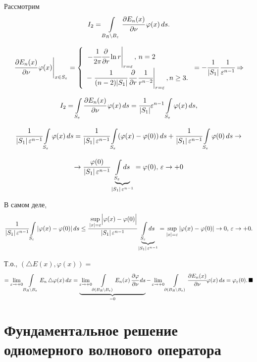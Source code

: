 \documentclass[12pt,a4paper,draft]{article}
\DeclareRobustCommand*{\т}{~--- }
\DeclareRobustCommand*{\ч}{~-- }
\begin{document}
Рассмотрим $$I_2=\int\limits_{B_R\setminus
B_{\varepsilon}}\cfrac{\partial E_n(x)}{\partial
\nu}\,\varphi(x)\,ds.$$

$$\left.\cfrac{\partial E_n(x)}{\partial
\nu}\,\varphi(x)\right|_{x\in S_{\varepsilon}}=
\left\{%
\begin{array}{ll}
    \left.-\cfrac1{2\pi} \cfrac {\partial}{\partial r}\ln r\right|_{r=\varepsilon},\,n=2  \\

    -\left.\cfrac1{(n-2)|S_1|}\,\cfrac {\partial}{\partial r}\,\cfrac1{r^{n-2}}\right|_{r=\varepsilon},
     n\ge3. \\
\end{array}%
\right.= -\cfrac1{|S_1|}\,\cfrac1{\varepsilon^{n-1}} \Rightarrow$$

$$I_2=\int\limits_{S_\varepsilon}\cfrac{\partial E_n(x)}{\partial
\nu}\,\varphi(x)\,ds=
\cfrac1{|S_1|}\varepsilon^{n-1}\int\limits_{S_\varepsilon}\varphi(x)\,ds,$$

$$\cfrac1{|S_1|\,\varepsilon^{n-1}}\int\limits_{S_\varepsilon}\varphi(x)\,ds=
\cfrac1{|S_1|\,\varepsilon^{n-1}}\int\limits_{S_\varepsilon}(\varphi(x)-\varphi(0))\,ds+
\cfrac1{|S_1|\,\varepsilon^{n-1}}\int\limits_{S_\varepsilon}\varphi(0)\,ds\to$$

$$\to\cfrac{\varphi(0)}{|S_1|\,\varepsilon^{n-1}}
\underbrace{\int\limits_{S_\varepsilon}ds}_{|S_1|\,\varepsilon^{n-1}}=\varphi(0),\,\varepsilon\to+0
$$

В самом деле,
$$\cfrac1{|S_1|\,\varepsilon^{n-1}}\int\limits_{S_\varepsilon}|\varphi(x)-\varphi(0)|\,ds\le
\cfrac{\sup\limits_{|x|=\varepsilon}\Bigl|\varphi(x)-\varphi(0)\Bigr|}{|S_1|\,\varepsilon^{n-1}}
\underbrace{\int\limits_{S_\varepsilon}ds}_{|S_1|\,\varepsilon^{n-1}}=
\sup\limits_{|x|=\varepsilon}|\varphi(x)-\varphi(0)|\to0,\,\varepsilon\to+0.$$

Т.о., $(\triangle E(x),\varphi(x))=$
$$=\lim_{\varepsilon\to+0}\int\limits_{B_R\setminus
B_{\varepsilon}}E_n\,\triangle\varphi(x)\,dx=
\underbrace{\lim_{\varepsilon\to+0}\int\limits_{\partial(B_R\setminus
B_{\varepsilon})}E_n(x)\, \cfrac{\partial \varphi}{\partial
\nu}\,ds}_{=0}-
\lim_{\varepsilon\to+0}\int\limits_{\partial(B_R\setminus
B_{\varepsilon})}\cfrac{\partial E_n(x)}{\partial
\nu}\varphi(x)\,ds=\varphi_{\varepsilon}(0).\,\blacksquare$$


\section{Фундаментальное решение одномерного волнового оператора}
\end{document}
